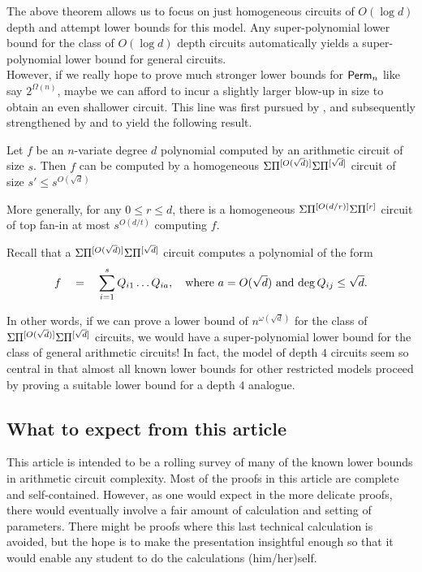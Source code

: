 The above theorem allows us to focus on just homogeneous circuits of $O(\log d)$ depth and attempt lower bounds for this model. 
Any super-polynomial lower bound for the class of $O(\log d)$ depth circuits automatically yields a super-polynomial lower bound for general circuits. \\

However, if we really hope to prove much stronger lower bounds for $\operatorname{\mathsf{Perm}}_n$ like say $2^{\Omega(n)}$, maybe we can afford to incur a slightly larger blow-up in size to obtain an even shallower circuit. 
This line was first pursued by \cite{av08}, and subsequently strengthened by \cite{koiran} and \cite{Tav13} to yield the following result. 

\begin{theorem} 
  Let $f$ be an $n$-variate degree $d$ polynomial computed by an arithmetic circuit of size $s$. 
Then $f$ can be computed by a homogeneous $\Sigma\Pi^{[O(\sqrt{d})]}\Sigma\Pi^{[\sqrt{d}]}$ circuit of size $s' \leq s^{O(\sqrt{d})}$

More generally, for any $0\leq r\leq d$, there is a homogeneous $\Sigma\Pi^{[O(d/r)]}\Sigma\Pi^{[r]}$ circuit of top fan-in at most $s^{O(d/t)}$ computing $f$. 
\end{theorem}

Recall that a $\Sigma\Pi^{[O(\sqrt{d})]}\Sigma\Pi^{[\sqrt{d}]}$ circuit computes a polynomial of the form
\[
f\quad = \quad \sum_{i=1}^s Q_{i1}\dots Q_{ia},\quad \text{where $a = O(\sqrt{d})$ and $\deg Q_{ij} \leq \sqrt{d}$}.
\]

In other words, if we can prove a lower bound of $n^{\omega(\sqrt{d})}$ for the class of $\Sigma\Pi^{[O(\sqrt{d})]}\Sigma\Pi^{[\sqrt{d}]}$ circuits, we would have a super-polynomial lower bound for the class of general arithmetic circuits! 
In fact, the model of depth $4$ circuits seem so central in that almost all known lower bounds for other restricted models proceed by proving a suitable lower bound for a depth $4$ analogue. \\

\subsection*{What to expect from this article}

This article is intended to be a rolling survey of many of the known lower bounds in arithmetic circuit complexity. 
Most of the proofs in this article are complete and self-contained. 
However, as one would expect in the more delicate proofs, there would eventually involve a fair amount of calculation and setting of parameters. 
There might be proofs where this last technical calculation is avoided, but the hope is to make the presentation insightful enough so that it would enable any student to do the calculations (him/her)self.

